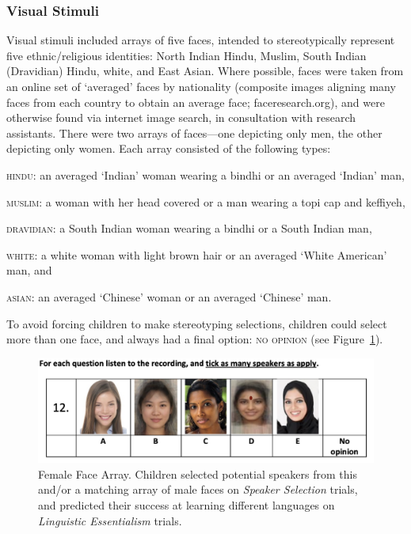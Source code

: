 \documentclass{foushee-adapted-preprint}
\begin{document}
\subsubsection*{Visual Stimuli}
Visual stimuli included arrays of five faces, intended to stereotypically represent five ethnic/religious identities: North Indian Hindu, Muslim, South Indian (Dravidian) Hindu, white, and East Asian. 
Where possible, faces were taken from an online set of `averaged' faces by nationality (composite images aligning many faces from each country to obtain an average face; faceresearch.org), and were otherwise found via internet image search, in consultation with research assistants. 
There were two arrays of faces---one depicting only men, the other depicting only women. Each array consisted of the following types: 
\begin{inparaenum}[(1)]
    \item \textsc{hindu}: an averaged `Indian' woman wearing a bindhi or an averaged `Indian' man,
    \item \textsc{muslim}: a woman with her head covered or a man wearing a topi cap and keffiyeh,
    \item \textsc{dravidian}: a South Indian woman wearing a bindhi or a South Indian man,
    \item \textsc{white}: a white woman with light brown hair or an averaged `White American' man, and
    \item \textsc{asian}:  an averaged `Chinese' woman or an averaged `Chinese' man. 
\end{inparaenum}
To avoid forcing children to make stereotyping selections, children could select more than one face, and always had a final option: \textsc{no opinion} (see Figure~\ref{fig:face-array}).

\begin{figure}
    \centering
    \includegraphics[width=\linewidth]{figures/female-face-array.png}
    \caption{Female Face Array. Children selected potential speakers from this and/or a matching array of male faces on \textit{Speaker Selection} trials, and predicted their success at learning different languages on \textit{Linguistic Essentialism} trials.}
    \label{fig:face-array}
\end{figure}
\end{document}
